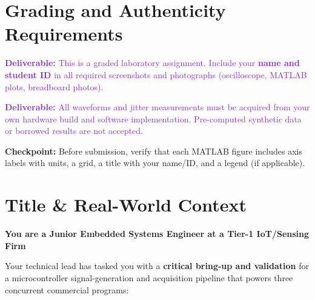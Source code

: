 \documentclass[11pt,letterpaper]{article}
\providecommand{\cpECE}[1]{\textcolor{OliveGreen}{\textbf{Checkpoint:} #1}}
\providecommand{\delECE}[1]{\textcolor{BlueViolet}{\textbf{Deliverable:} #1}}
\begin{document}
\clearpage

\section*{Grading and Authenticity Requirements}
\delECE{This is a graded laboratory assignment. Include your \textbf{name and student ID} in all required screenshots and photographs (oscilloscope, MATLAB plots, breadboard photos).}

\delECE{All waveforms and jitter measurements must be acquired from your own hardware build and software implementation. Pre-computed synthetic data or borrowed results are not accepted.}

\cpECE{Before submission, verify that each MATLAB figure includes axis labels with units, a grid, a title with your name/ID, and a legend (if applicable).}

\clearpage

\section*{Title \& Real-World Context}

\noindent
\textbf{\large You are a Junior Embedded Systems Engineer at a Tier-1 IoT/Sensing Firm}

\noindent
Your technical lead has tasked you with a \textbf{critical bring-up and validation} for a microcontroller signal-generation and acquisition pipeline that powers three concurrent commercial programs:
\end{document}
